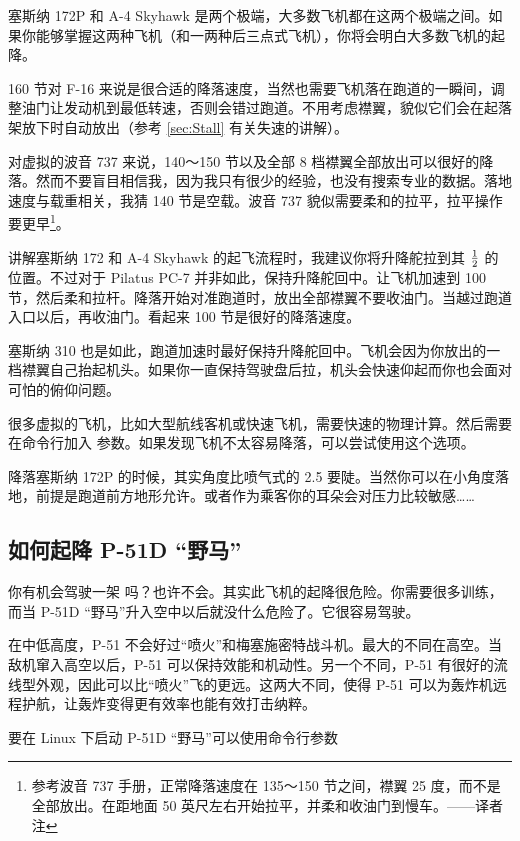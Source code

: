 \begin{itemize}
塞斯纳 172P 和 A-4 Skyhawk 是两个极端，大多数飞机都在这两个极端之间。如果你能够掌握这两种飞机（和一两种后三点式飞机），你将会明白大多数飞机的起降。

160 节对 F-16 来说是很合适的降落速度，当然也需要飞机落在跑道的一瞬间，调整油门让发动机到最低转速，否则会错过跑道。不用考虑襟翼，貌似它们会在起落架放下时自动放出（参考 \ref{sec:Stall} 有关失速的讲解）。

对虚拟的波音 737 来说，140～150 节以及全部 8 档襟翼全部放出可以很好的降落。然而不要盲目相信我，因为我只有很少的经验，也没有搜索专业的数据。落地速度与载重相关，我猜 140 节是空载。波音 737 貌似需要柔和的拉平，拉平操作要更早\footnote{参考波音 737 手册，正常降落速度在 135～150 节之间，襟翼 25 度，而不是全部放出。在距地面 50 英尺左右开始拉平，并柔和收油门到慢车。——译者注}。

讲解塞斯纳 172 和 A-4 Skyhawk 的起飞流程时，我建议你将升降舵拉到其 $1\over2$ 的位置。不过对于 Pilatus PC-7 并非如此，保持升降舵回中。让飞机加速到 100 节，然后柔和拉杆。降落开始对准跑道时，放出全部襟翼不要收油门。当越过跑道入口以后，再收油门。看起来 100 节是很好的降落速度。

塞斯纳 310 也是如此，跑道加速时最好保持升降舵回中。飞机会因为你放出的一档襟翼自己抬起机头。如果你一直保持驾驶盘后拉，机头会快速仰起而你也会面对可怕的俯仰问题。

很多虚拟的飞机，比如大型航线客机或快速飞机，需要快速的物理计算。然后需要在命令行加入  参数。如果发现飞机不太容易降落，可以尝试使用这个选项。

降落塞斯纳 172P 的时候，其实角度比喷气式的 2.5\textdegree{} 要陡。当然你可以在小角度落地，前提是跑道前方地形允许。或者作为乘客你的耳朵会对压力比较敏感……

\subsection{如何起降 P-51D “野马”}
\label{sec:P-51D}
你有机会驾驶一架 吗？也许不会。其实此飞机的起降很危险。你需要很多训练，而当 P-51D “野马”升入空中以后就没什么危险了。它很容易驾驶。

在中低高度，P-51 不会好过“喷火”和梅塞施密特战斗机。最大的不同在高空。当敌机窜入高空以后，P-51 可以保持效能和机动性。另一个不同，P-51 有很好的流线型外观，因此可以比“喷火”飞的更远。这两大不同，使得 P-51 可以为轰炸机远程护航，让轰炸变得更有效率也能有效打击纳粹。

要在 Linux 下启动 P-51D “野马”可以使用命令行参数 


\end{itemize}
